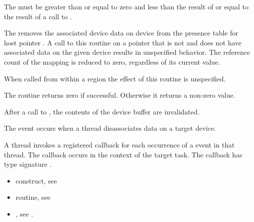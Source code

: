 \begin{ccppspecific}
\constraints
The  must be greater than or equal to zero and less 
than the result of  or equal to the result 
of a call to .

\effect
The  removes the associated device data
on device  from the presence table for host pointer
. A call to this routine on a pointer that is not
 and does not have associated data on the given device results
in unspecified behavior.  The reference count of the mapping is reduced to
zero, regardless of its current value.

When called from within a  region
the effect of this routine is unspecified.

The routine returns zero if successful. Otherwise it returns a non-zero value.

After a call to , the contents of the device
buffer are invalidated.

\events
The  event occurs when a thread 
disassociates data on a target device.

\tools
A thread invokes a registered 
callback for each occurrence of a  
event in that thread. The callback occurs in the context of the 
target task.  The callback has type signature .

\crossreferences
\begin{itemize}
\item {} construct, see

\item {} routine, see

\item {}, see
.
\end{itemize}

\end{ccppspecific}
